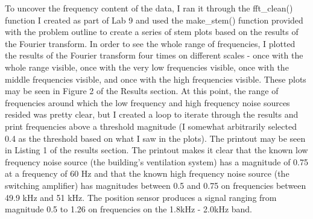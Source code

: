 \documentclass[12pt]{article}
\begin{document}
    \par To uncover the frequency content of the data, I ran it through the fft\_clean() function I created as part of Lab 9 and used the make\_stem() function provided with the problem outline to create a series of stem plots based on the results of the Fourier transform. In order to see the whole range of frequencies, I plotted the results of the Fourier transform four times on different scales - once with the whole range visible, once with the very low frequencies visible, once with the middle frequencies visible, and once with the high frequencies visible. These plots may be seen in Figure 2 of the Results section. At this point, the range of frequencies around which the low frequency and high frequency noise sources resided was pretty clear, but I created a loop to iterate through the results and print frequencies above a threshold magnitude (I somewhat arbitrarily selected 0.4 as the threshold based on what I saw in the plots). The printout may be seen in Listing 1 of the results section. The printout makes it clear that the known low frequency noise source (the building's ventilation system) has a magnitude of 0.75 at a frequency of 60 Hz and that the known high frequency noise source (the switching amplifier) has magnitudes between 0.5 and 0.75 on frequencies between 49.9 kHz and 51 kHz. The position sensor produces a signal ranging from magnitude 0.5 to 1.26 on frequencies on the 1.8kHz - 2.0kHz band.
    
\end{document}
